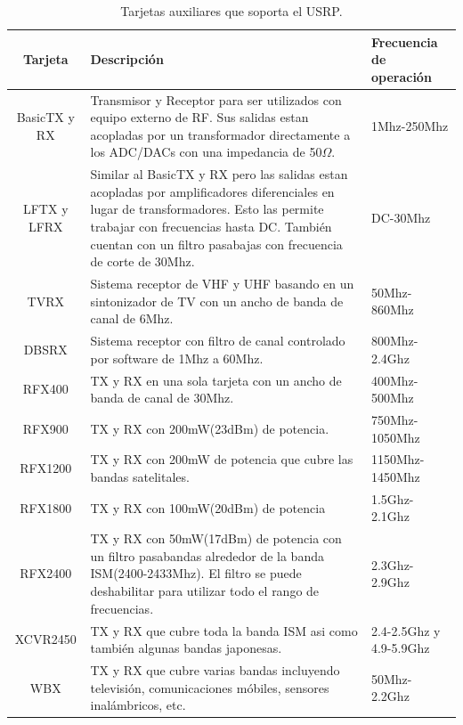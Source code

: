 \begin{table}[htp]
\begin{center}
	\begin{tabular}{|c|p{8cm}|p{3cm}|}
		\hline
		\textbf{Tarjeta} & \textbf{Descripci\'on} & \textbf{Frecuencia de operaci\'on}\\
		\hline
		BasicTX y RX & Transmisor y Receptor para ser utilizados con equipo externo de RF. Sus salidas
		estan acopladas por un transformador directamente a los ADC/DACs con una impedancia de 50$\Omega$.
		& 1Mhz-250Mhz\\
		\hline
		LFTX y LFRX & Similar al BasicTX y RX pero las salidas estan acopladas por amplificadores
		diferenciales en lugar de transformadores. Esto las permite trabajar con frecuencias hasta DC.
		Tambi\'en cuentan con un filtro pasabajas con frecuencia de corte de 30Mhz. & DC-30Mhz\\
		\hline
		TVRX & Sistema receptor de VHF y UHF basando en un sintonizador de TV con un ancho de banda de
		canal de 6Mhz. & 50Mhz-860Mhz\\
		\hline
		DBSRX & Sistema receptor con filtro de canal controlado por software de 1Mhz a 60Mhz. &
		800Mhz-2.4Ghz\\
		\hline
		RFX400 & TX y RX en una sola tarjeta con un ancho de banda de canal de 30Mhz. & 400Mhz-500Mhz\\
		\hline
		RFX900 & TX y RX con 200mW(23dBm) de potencia.  & 750Mhz-1050Mhz\\
		\hline
		RFX1200 & TX y RX con 200mW de potencia que cubre las bandas satelitales. & 1150Mhz-1450Mhz\\
		\hline
		RFX1800 & TX y RX con 100mW(20dBm) de potencia & 1.5Ghz-2.1Ghz\\
		\hline
		RFX2400 & TX y RX con 50mW(17dBm) de potencia con un filtro pasabandas alrededor de la banda
		ISM(2400-2433Mhz). El filtro se puede deshabilitar para utilizar todo el rango de frecuencias. &
		2.3Ghz-2.9Ghz\\
		\hline
		XCVR2450 & TX y RX que cubre toda la banda ISM asi como tambi\'en algunas bandas japonesas. &
		2.4-2.5Ghz y 4.9-5.9Ghz\\
		\hline
		WBX & TX y RX que cubre varias bandas incluyendo televisi\'on, comunicaciones m\'obiles, sensores
		inal\'ambricos, etc. & 50Mhz-2.2Ghz\\
		\hline
	\end{tabular}
	\vspace{0.5in}
	\caption{Tarjetas auxiliares que soporta el USRP.}
	\label{tbl:cards}
\end{center}
\end{table}

